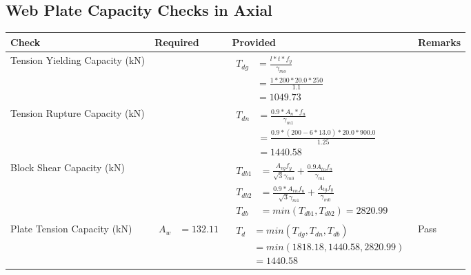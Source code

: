 \documentclass{article}%
\begin{document}
\subsection{Web Plate Capacity Checks in Axial}%
\label{subsec:WebPlateCapacityChecksinAxial}%
\renewcommand{\arraystretch}{1.2}%
\begin{longtable}{|p{4cm}|p{6cm}|p{5.5cm}|p{1.5cm}|}%
\hline%
\rowcolor{OsdagGreen}%
Check&Required&Provided&Remarks\\%
\hline%
\endhead%
\hline%
Tension Yielding Capacity (kN)&&$\begin{aligned} T_{dg} &= \frac{l*t*f_y}{\gamma_{mo}}\\ &=\frac{1*200*20.0*250}{1.1}\\ &=1049.73\end{aligned}$&\\%
\hline%
Tension Rupture Capacity (kN)&&$\begin{aligned} T_{dn} &= \frac{0.9*A_{n}*f_u}{\gamma_{m1}}\\ &=\frac{0.9*(200-6*13.0)*20.0*900.0}{1.25}\\ &=1440.58\end{aligned}$&\\%
\hline%
Block Shear Capacity (kN)&&$\begin{aligned}T_{db1} &= \frac{A_{vg} f_{y}}{\sqrt{3} \gamma_{m0}} + \frac{0.9 A_{tn} f_{u}}{\gamma_{m1}}\\ T_{db2} &= \frac{0.9*A_{vn} f_{u}}{\sqrt{3} \gamma_{m1}} + \frac{A_{tg} f_{y}}{\gamma_{m0}}\\ T_{db} &= min(T_{db1}, T_{db2})= 2820.99\end{aligned}$&\\%
\hline%
Plate Tension Capacity (kN)&$\begin{aligned} A_w &=132.11\end{aligned}$&$\begin{aligned} T_d &= min(T_{dg},T_{dn},T_{db})\\ &= min(1818.18,1440.58,2820.99)\\ &=1440.58\end{aligned}$&Pass\\%
\hline%
\end{longtable}

%
\newpage%
\end{document}
